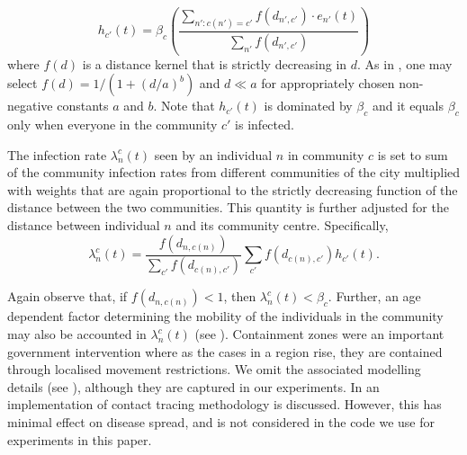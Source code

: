 \documentclass{article}
\theoremstyle{definition}
\begin{document}
  \begin{equation} \label{eqn:comm1}
   h_{c'}(t) = \beta_{c} \left( \frac{\sum_{n': c(n') = c'} f(d_{n',c'}) \cdot e_{n'}(t) }{\sum_{n'} f(d_{n',c'})}  \right)
   \end{equation}
where  $f(d)$ is a distance kernel that is strictly decreasing in $d$. As in  \cite{ferguson2005strategies}, one may select
 $f(d) = 1/(1+(d/a)^b)$ and $d \ll a$ for appropriately chosen non-negative constants $a$ and $b$.
 Note that $h_{c'}(t)$ is dominated by $\beta_{c}$ and it equals $\beta_{c}$ only when everyone
 in the community $c'$ is infected.
 
 
The infection rate  $\lambda_n^{c}(t)$ seen by an individual $n$ in community $c$ is set to sum of the community infection rates from different communities of the city multiplied with weights that are again proportional to  the strictly decreasing function of the distance between  the two communities. 
This quantity is further adjusted for the  distance between individual $n$ and its community centre. Specifically,
 \begin{equation} \label{eqn:comm2}
 \lambda_n^{c}(t)= \frac{ f(d_{n,c(n)})}
  {\sum_{c'}f(d_{c(n),c'})} \sum_{c'} f(d_{c(n),c'})
  h_{c'}(t).
  \end{equation}
  
  Again observe that, if  $f(d_{n,c(n)})<1$, then $\lambda_n^{c}(t) < \beta_c$.  Further, an age dependent factor determining the mobility of the individuals in the community may  also be accounted in $\lambda_n^{c}(t)$
(see \cite{City_Simulator_IISc_TIFR_2020}). 
 Containment zones were an important government intervention where as the cases in a region rise, they are  contained through localised
 movement restrictions. We omit the associated modelling details (see \cite{harsha2020covidmumbai}), although they are captured in our experiments. In \cite{City_Simulator_IISc_TIFR_2020} an implementation of contact tracing methodology is discussed. However, this has minimal effect on disease spread, and is not considered in the code we use for experiments in this paper.
 



\end{document}
